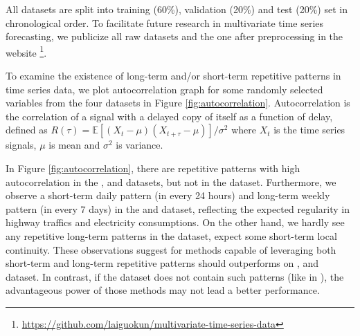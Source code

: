 All datasets are split into training (60\%), validation (20\%) and test (20\%) set in chronological order. To facilitate future research in multivariate time series forecasting, we publicize all raw datasets and the one after preprocessing in the website
\footnote{\url{https://github.com/laiguokun/multivariate-time-series-data}}.

To examine the existence of long-term and/or short-term repetitive patterns in time series data, we plot autocorrelation graph for some randomly selected variables from the four datasets in Figure \ref{fig:autocorrelation}.
Autocorrelation is the correlation of a signal with a delayed copy of itself as a function of delay, defined as
	$R(\tau) =  \mathbb{E}[(X_t - \mu)(X_{t+\tau} - \mu)] / \sigma^2$
where $X_t$ is the time series signals, $\mu$ is mean and $\sigma^2$ is variance.

In Figure \ref{fig:autocorrelation}, there are repetitive patterns with high autocorrelation in the \traffic, \solar and \electricity datasets, but not in the \exchange dataset. Furthermore, we observe a short-term daily pattern (in every 24 hours) and long-term weekly pattern (in every 7 days) in the \traffic and \electricity dataset, reflecting the expected regularity in highway traffics and electricity consumptions.  On the other hand, we hardly see any repetitive long-term patterns in the \exchange dataset, expect some short-term local continuity. 
These observations suggest for methods capable of leveraging both short-term and long-term repetitive patterns should outperforms on \electricity, \traffic and \solar dataset. In contrast, if the dataset does not contain such patterns (like in \exchange), the advantageous power of those methods may not lead a better performance.

